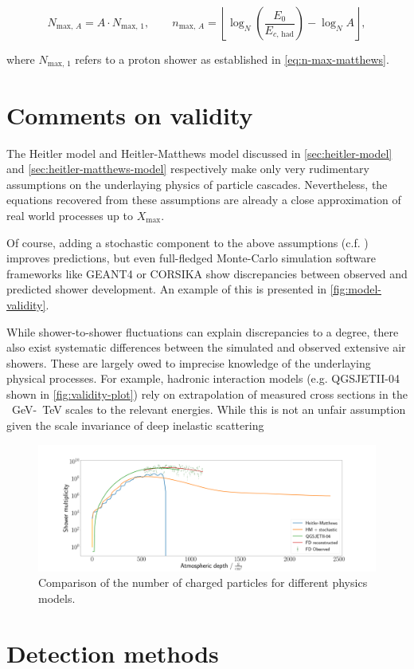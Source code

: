 \begin{equation}
N_{\text{max},\,A} = A \cdot N_{\text{max},\,1}, \qquad n_{\text{max},\,A} = \left\lfloor \log_N\left(\frac{E_0}{E_{c,\,\text{had}}}\right) - \log_N A \right\rfloor,
\end{equation}

where $N_{\text{max},\,1}$ refers to a proton shower as established in \autoref{eq:n-max-matthews}.

\section{Comments on validity}
\label{sec:cr-shower-validity}

The Heitler model and Heitler-Matthews model discussed in \autoref{sec:heitler-model} and \autoref{sec:heitler-matthews-model} respectively make only very 
rudimentary assumptions on the underlaying physics of particle cascades. Nevertheless, the equations recovered from these assumptions are already a close 
approximation of real world processes up to $X_\text{max}$. 

Of course, adding a stochastic component to the above assumptions (c.f. \cite{MartinShowerSim}) improves predictions, but even full-fledged Monte-Carlo simulation 
software frameworks like GEANT4 \cite{agostinelli2003geant4} or CORSIKA \cite{heck1998corsika} show discrepancies between observed and predicted shower 
development. An example of this is presented in \autoref{fig:model-validity}. 

While shower-to-shower fluctuations can explain discrepancies to a degree, there also exist systematic differences between the simulated and observed extensive air
showers. These are largely owed to imprecise knowledge of the underlaying physical processes. For example, hadronic interaction models (e.g. QGSJETII-04 shown in 
\autoref{fig:validity-plot}) rely on extrapolation of measured cross sections in the \SI{}{\giga\electronvolt}-\SI{}{\tera\electronvolt} scales to the relevant 
energies. While this is not an unfair assumption given the scale invariance of deep inelastic scattering 

\begin{figure}
	\centering
	\includegraphics[width=1.0\textwidth]{./plots/validity_plot.png}
	\caption{Comparison of the number of charged particles for different physics models. }
	\label{fig:LABEL}
\end{figure}

\section{Detection methods}
\label{sec:detecion-methods}
